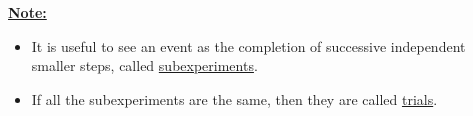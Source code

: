 \underline{\textbf{Note:}} 
\begin{itemize}
\item It is useful to see an event as the completion of successive independent smaller steps, called \underline{subexperiments}.
\item If all the subexperiments are the same, then they are called \underline{trials}.
\end{itemize}


\begin{comment}
\section{Problems Set}

\subsection*{Conditional Probabilities}
	
	\begin{problem}
	Let $(S, \mathcal{A} , P )$ be a probability space. Suppose two events $A$ and $B$ are given such that $P (A) = 0.5$, $P(B) = 0.3$, and $P (A \cap B) = 0.1$. Find
		\begin{enumerate}[label=\alph*)]
		\begin{multicols}{3}
		\item $P(A|B)$.
		\item $P (A | A \cup B)$.
		\item $P (A \cap B | A \cup B )$.
		\end{multicols}
		\end{enumerate}			
	\end{problem}

	\begin{problem}
	A balanced die is tossed once. What is the probability the die lands on a $1$, given that an odd number was obtained?
	\end{problem}

	\begin{problem}
	Two fair dice are rolled. What is the probability that at least one lands on 6 given that the dice land on different numbers?
	\end{problem}

	\begin{problem}
	Let $(S , \mathcal{A} , P)$ be a probability space. Suppose that two events $A$ and $B$ are given such that $P (A) > 0$, $P (B) > 0$. Prove that if $P (A) < P (A | B)$, then $P (B) < P (B | A)$.
	\end{problem}
	

\end{comment}
